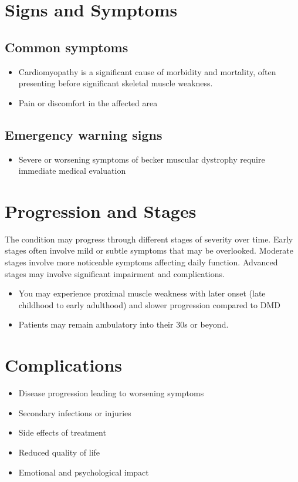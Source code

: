 \section{Signs and Symptoms}

\subsection{Common symptoms}
\begin{itemize}[noitemsep]
  \item Cardiomyopathy is a significant cause of morbidity and mortality, often presenting before significant skeletal muscle weakness.
  \item Pain or discomfort in the affected area
  \end{itemize}

\subsection{Emergency warning signs}
\begin{itemize}[noitemsep]
  \item Severe or worsening symptoms of becker muscular dystrophy require immediate medical evaluation
\end{itemize}
\section{Progression and Stages}
The condition may progress through different stages of severity over time. Early stages often involve mild or subtle symptoms that may be overlooked. Moderate stages involve more noticeable symptoms affecting daily function. Advanced stages may involve significant impairment and complications.

\begin{itemize}[noitemsep]
  \item You may experience proximal muscle weakness with later onset (late childhood to early adulthood) and slower progression compared to DMD
  \item Patients may remain ambulatory into their 30s or beyond.
\end{itemize}
\section{Complications}
\begin{itemize}[noitemsep]
  \item Disease progression leading to worsening symptoms
  \item Secondary infections or injuries
  \item Side effects of treatment
  \item Reduced quality of life
  \item Emotional and psychological impact
\end{itemize}
